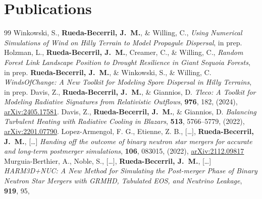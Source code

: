 \section{Publications}

\renewcommand{\refname}{Articles}
\setcounter{num}{0}
\renewcommand{\MyNbOfPub}{12}%
\renewcommand*{\bibliographyitemlabel}{[\arabic{enumiv}]}
\begin{thebibliography}{99}
   Winkowski, S., \textbf{Rueda-Becerril, J.~M.},
  \& Willing, C., \textit{Using Numerical Simulations of Wind on Hilly Terrain
  to Model Propagule Dispersal}, in prep.
 Holzman, L., \textbf{Rueda-Becerril, J.~M.},
  Creamer, C., \& Willing, C., \textit{Random Forest Link Landscape Position to
  Drought Resilience in Giant Sequoia Forests}, in prep.
 \textbf{Rueda-Becerril, J.~M.}, \&
  Winkowski, S., \& Willing, C. \textit{WindsOfChange: A New Toolkit for
  Modeling Spore Dispersal in Hilly Terrains}, in prep.
 Davis, Z., \textbf{Rueda-Becerril, J.~M.}, \&
  Giannios, D. \textit{Tleco: A Toolkit for Modeling Radiative Signatures from
  Relativistic Outflows}, \href{https://doi.org/10.3847/1538-4357/ad8bc2}{\apj}
  \textbf{976}, 182, (2024),
  \href{https://arxiv.org/abs/2405.17581}{arXiv:2405.17581}.
 Davis, Z., \textbf{Rueda-Becerril, J.~M.}, \&
  Giannios, D. \textit{Balancing Turbulent Heating with Radiative Cooling in
  Blazars}, \href{https://doi.org/10.1093/mnras/stac1282}{\mnras} \textbf{513},
  5766--5779, (2022),
  \href{https://arxiv.org/abs/2201.07790}{arXiv:2201.07790}.
 Lopez-Armengol, F. G., Etienne, Z. B., [\ldots],
  \textbf{Rueda-Becerril, J.~M.}, [\ldots] \textit{Handing off the outcome of
  binary neutron star mergers for accurate and long-term postmerger
  simulations}, \href{https://doi.org/10.1103/PhysRevD.106.083015}{\prd}
  \textbf{106}, 083015, (2022),
  \href{https://arxiv.org/abs/2112.09817}{arXiv:2112.09817}
 Murguia-Berthier, A., Noble, S., [\ldots],
  \textbf{Rueda-Becerril, J.~M.}, [\ldots] \textit{HARM3D+NUC: A New Method for
  Simulating the Post-merger Phase of Binary Neutron Star Mergers with GRMHD,
  Tabulated EOS, and Neutrino Leakage},
  \href{https://doi.org/10.3847/1538-4357/ac1119}{\apj} \textbf{919}, 95,

\end{thebibliography}
